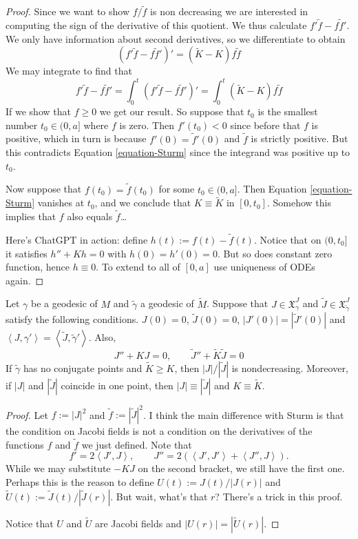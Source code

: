 \documentclass{book}
\begin{document}
\begin{proof}
Since we want to show $f/\tilde{f}$ is non
decreasing we are interested in
computing the sign of the derivative of this
quotient. We thus calculate
$f'\tilde{f}-f \tilde{f}'$. We only have
information about second derivatives,
so we differentiate to obtain
$$
(f'\tilde{f}-f
\tilde{f}')'=(\tilde{K}-K)f\tilde{f}
$$
We may integrate to find that
\begin{equation}
\label{equation-Sturm}
f'\tilde{f}-f \tilde{f}'=\int_0^t
(f'\tilde{f}-f \tilde{f}')'
=\int_0^t (\tilde{K}-K)f\tilde{f}
\end{equation}
If we show that $f\geq 0$ we get our result.
So suppose that $t_0$ is the
smallest number $t_0 \in (0,a]$ where $f$ is
zero. Then $f'(t_0)<0$ since before
that $f$ is positive, which in turn is
because $f'(0)=\tilde{f}'(0)$ and
$\tilde{f}$ is strictly positive. But this
contradicts Equation
\ref{equation-Sturm} since the integrand was
positive up to $t_0$.

Now suppose that $f(t_0)=\tilde{f}(t_0)$ for
some $t_0 \in (0,a]$. Then Equation
\ref{equation-Sturm} vanishes at $t_0$, and
we conclude that $K \equiv
\tilde{K}$ in $[0,t_0]$. Somehow this implies
that $f$ also equals $\tilde{f}$…

Here's ChatGPT in action: define
$h(t):=f(t)-\tilde{f}(t)$. Notice that on
$(0,t_0]$ it satisfies $h''+Kh=0$ with
$h(0)=h'(0)=0$. But so does constant zero
function, hence  $h\equiv0$. To extend to all
of $[0,a]$ use uniqueness of
ODEs again.
\end{proof}

\begin{theorem}[Rauch]
\label{theorem-Rauch}
Let $\gamma$ be a geodesic of $M$ and
$\tilde{\gamma}$ a geodesic of
$\tilde{M}$. Suppose that $J \in
\mathfrak{X}^J_\gamma$ and $\tilde{J}\in
\mathfrak{X}^J_{\tilde{\gamma}}$ satisfy the
following conditions. $J(0)=0$,
$\tilde{J}(0)=0$, $|J'(0)|=|\tilde{J}'(0)|$
and
$\left\langle{}J,\gamma'\right\rangle{}=\left\langle{}\tilde{J},
\tilde{\gamma}'\right\rangle{}$.
Also,
$$
J''+K J=0,\qquad
\tilde{J}''+\tilde{K}\tilde{J}=0
$$
If $\tilde{\gamma}$ has no conjugate points
and $\tilde{K}\geq K$, then
$|J|/|\tilde{J}|$ is nondecreasing. Moreover,
if $|J|$ and $|\tilde{J}|$
coincide in one point, then $|J|\equiv
|\tilde{J}|$ and $K \equiv \tilde{K}$.
\end{theorem}

\begin{proof}
Let $f:=|J|^2$ and
$\tilde{f}:=|\tilde{J}|^2$. I think the main
difference with
Sturm is that the condition on Jacobi fields
is not a condition on the
derivatives of the functions $f$ and
$\tilde{f}$ we just defined. Note that
$$
f'=2\left\langle{}J',J\right\rangle{},\qquad
J''=2(\left\langle{}J',J'\right\rangle{}+\left\langle{}J'',J\right\rangle{}).
$$
While we may substitute $-KJ$ on the second
bracket, we still have the first
one. Perhaps this is the reason to define
$U(t):=J(t)/|J(r)|$ and
$\tilde{U}(t):=\tilde{J}(t)/|\tilde{J}(r)|$.
But wait, what's that $r$? There's
a trick in this proof.

Notice that $U$ and $\tilde{U}$ are Jacobi
fields and $|U(r)|=|\tilde{U}(r)|$.
\end{proof}
\end{document}
